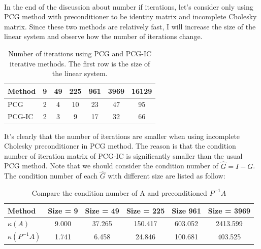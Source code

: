 \documentclass{article}
\begin{document}
\paragraph{}
In the end of the discussion about number if iterations, let's consider only using PCG method with preconditioner to be identity matrix and incomplete Cholesky matrix. Since these two methods are relatively fast, I will increase the size of the linear system and observe how the number of iterations change.
\begin{table}[h]
\begin{center}
\begin{tabular}{lcccccc}
\hline
Method & 9 & 49 & 225 & 961 & 3969 & 16129\\
\hline
PCG & 2 & 4 & 10 & 23 & 47 & 95\\
PCG-IC & 2 & 3 & 9 & 17 & 32 & 66\\
\hline
\end{tabular}
\caption{Number of iterations using PCG and PCG-IC iterative methods. The first row is the size of the linear system.}
\end{center}
\end{table}


It's clearly that the number of iterations are smaller when using incomplete Cholesky preconditioner in PCG method. The reason is that the condition number of iteration matrix of PCG-IC is significantly smaller than the usual PCG method. Note that we should consider the condition number of $\hat{G} = I-G$. The condition number of each $\hat{G}$ with different size are listed as follow:

\begin{table}[h]
\begin{center}
\begin{tabular}{lccccc}
\hline
Method & Size = 9 & Size = 49 & Size = 225 & Size 961 & Size = 3969\\
\hline
$\kappa(A)$ & 9.000 & 37.265 & 150.417 & 603.052 & 2413.599\\
$\kappa(P^{-1}A)$ & 1.741 & 6.458 & 24.846 & 100.681 & 403.525\\
\hline
\end{tabular}
\caption{Compare the condition number of A and preconditioned $P^{-1}A$}
\end{center}
\end{table}




\newpage
\end{document}
